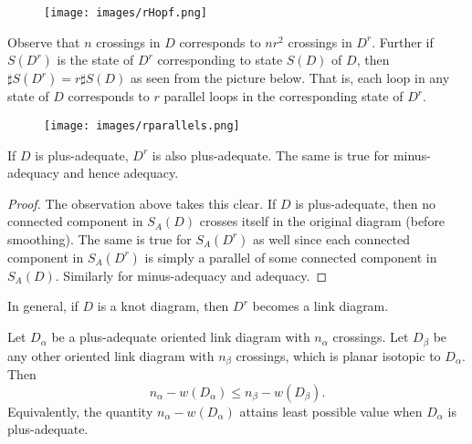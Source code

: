 \begin{figure}[h]
  \centering
  \texttt{[image: images/rHopf.png]}
\end{figure}

Observe that $n$ crossings in $D$ corresponds to $nr^2$ crossings in $D^r$. Further if $S(D^r)$ is the state of $D^r$ corresponding to state $S(D)$ of $D$, then $\sharp S(D^r) = r\sharp S(D)$ as seen from the picture below. That is, each loop in any state of $D$ corresponds to $r$ parallel loops in the corresponding state of $D^r$. 

\begin{figure}[h]
  \centering
  \texttt{[image: images/rparallels.png]}
\end{figure}


\begin{proposition}
\label{sec:second-tait-conj-3}
If $D$ is plus-adequate, $D^r$ is also plus-adequate. The same is true for minus-adequacy and hence adequacy.
\end{proposition}

\begin{proof}
\label{sec:second-tait-conj-2}
The observation above takes this clear. If $D$ is plus-adequate, then no connected component in $S_A(D)$ crosses itself in the original diagram (before smoothing). The same is true for $S_A(D^r)$ as well since each connected component in $S_A(D^r)$ is simply a parallel of some connected component in $S_A(D)$. Similarly for minus-adequacy and adequacy.
\end{proof}

In general, if $D$ is a knot diagram, then $D^r$ becomes a link diagram.

\begin{lemma}
\label{sec:second-tait-conj-5}
Let $D_{\alpha}$ be a plus-adequate oriented link diagram with $n_{\alpha}$ crossings. Let $D_{\beta}$ be any other oriented link diagram with $n_{\beta}$ crossings, which is planar isotopic to $D_{\alpha}$. Then 
\begin{displaymath}
n_{\alpha} - w(D_{\alpha}) \leq n_{\beta} - w(D_{\beta}).
\end{displaymath}
Equivalently, the quantity $n_{\alpha} - w(D_{\alpha})$ attains least possible value when $D_{\alpha}$ is plus-adequate.
\end{lemma}

